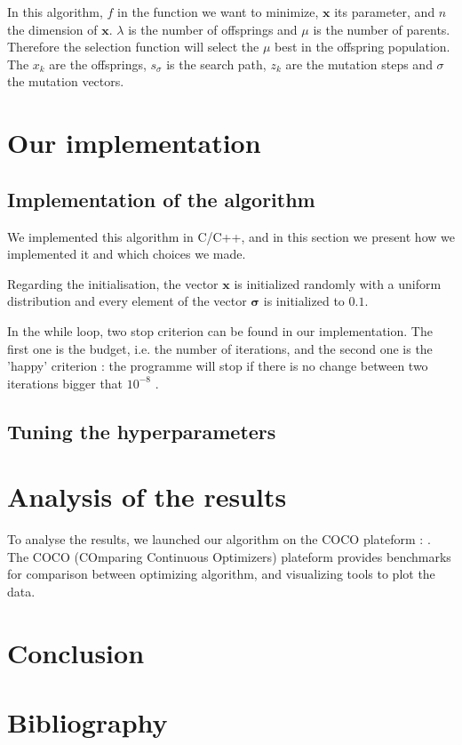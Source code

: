 \documentclass[transmag]{IEEEtran}
\begin{document}
In this algorithm, $f$ in the function we want to minimize, $\bm{x}$ its parameter, and $n$ the dimension of $\bm{x}$. $\lambda$ is the number of offsprings and $\mu$ is the number of parents. Therefore the selection function will select the $\mu$ best in the offspring population. The $x_k$ are the offsprings, $s_{\sigma}$ is the search path, $z_k$ are the mutation steps and $\sigma$ the mutation vectors. 


\section{Our implementation}

\subsection{Implementation of the algorithm}

We implemented this algorithm in C/C++, and in this section we present how we implemented it and which choices we made. 

Regarding the initialisation, the vector $\bm{x}$ is initialized randomly with a uniform distribution and every element of the vector $\bm{\sigma}$ is initialized to $0.1$. 

In the while loop, two stop criterion can be found in our implementation. The first one is the budget, i.e. the number of iterations, and the second one is the 'happy' criterion : the programme will stop if there is no change between two iterations bigger that $10^{-8}$ .


\subsection{Tuning the hyperparameters}
 

\section{Analysis of the results}

To analyse the results, we launched our algorithm on the COCO plateform : \cite{coco}. The COCO (COmparing Continuous Optimizers) plateform provides benchmarks for comparison between optimizing algorithm, and visualizing tools to plot the data.


\section{Conclusion}


\section{Bibliography}


\end{document}
